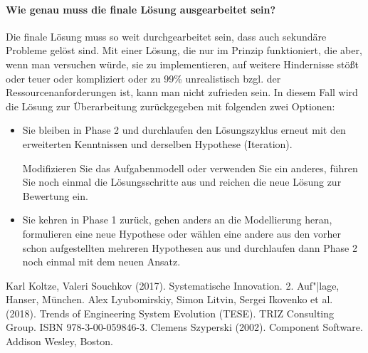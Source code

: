 \documentclass[11pt,a4paper]{article}
\begin{document}
\paragraph{Wie genau muss die finale Lösung ausgearbeitet sein?}
Die finale Lösung muss so weit durchgearbeitet sein, dass auch sekundäre
Probleme gelöst sind.  Mit einer Lösung, die nur im Prinzip funktioniert, die
aber, wenn man versuchen würde, sie zu implementieren, auf weitere Hindernisse
stößt oder teuer oder kompliziert oder zu 99\% unrealistisch bzgl. der
Ressourcenanforderungen ist, kann man nicht zufrieden sein.  In diesem Fall
wird die Lösung zur Überarbeitung zurückgegeben mit folgenden zwei Optionen:
\begin{itemize}
\item Sie bleiben in Phase 2 und durchlaufen den Lösungszyklus erneut mit den
  erweiterten Kenntnissen und derselben Hypothese (Iteration).
  
  Modifizieren Sie das Aufgabenmodell oder verwenden Sie ein anderes, führen
  Sie noch einmal die Lösungsschritte aus und reichen die neue Lösung zur
  Bewertung ein.
\item Sie kehren in Phase 1 zurück, gehen anders an die Modellierung heran,
  formulieren eine neue Hypothese oder wählen eine andere aus den vorher
  schon aufgestellten mehreren Hypothesen aus und durchlaufen dann Phase 2
  noch einmal mit dem neuen  Ansatz.
\end{itemize}


\begin{thebibliography}{xxx}
 Karl Koltze, Valeri Souchkov (2017). Systematische
  Innovation.  2. Auf"|lage, Hanser, München.  
 Alex Lyubomirskiy, Simon Litvin, Sergei Ikovenko et
  al. (2018). Trends of Engineering System Evolution (TESE).  TRIZ Consulting
  Group. ISBN 978-3-00-059846-3.
 Clemens Szyperski (2002). Component Software. Addison
  Wesley, Boston. 
\end{thebibliography}
\end{document}
